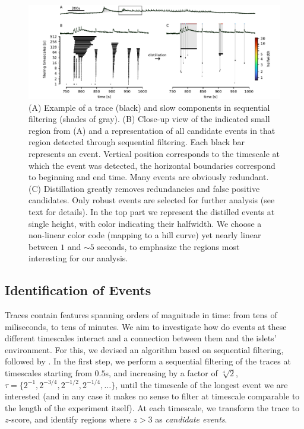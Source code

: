 \documentclass[a4paper,11pt,oneside,]{article}
\begin{document}
\begin{figure}[t]

 \centering
 \includegraphics[trim=12mm 0 0mm 0mm, scale=0.9]{figures/evdist.pdf}
 \caption{(A) Example of a trace (black) and slow components in sequential filtering (shades of gray). %
 (B) Close-up view of the indicated small region from (A) and a representation of all candidate events in that region detected through sequential filtering.
 Each black bar represents an event. Vertical position corresponds to the timescale at which the event was detected, the horizontal boundaries correspond to beginning and end time.
 Many events are obviously redundant. 
 (C) Distillation greatly removes redundancies and false positive candidates. Only robust events are selected for further analysis (see text for details). 
 In the top part we represent the distilled events at single height, with color indicating their halfwidth.
 We choose a non-linear color code (mapping to a hill curve) yet nearly linear between $1$ and $\sim 5$ seconds, to emphasize the regions most interesting for our analysis.
 }
 \label{fig:evdist_demo}
\end{figure}


\subsection{Identification of Events}

Traces contain features spanning orders of magnitude in time: from tens of miliseconds, to tens of minutes. 
We aim to investigate how do events at these different timescales interact and a connection between them and the islets' environment.
For this, we devised an algorithm based on sequential filtering, followed by .
In the first step, we perform a sequential filtering of the traces at timescales starting from $0.5$s, and increasing by a factor of $\sqrt[4]{2}$,  $\tau = \{2^{-1}, 2^{-3/4}, 2^{-1/2}, 2^{-1/4},\dots\}$, until the timescale of the longest event we are interested (and in any case it makes no sense to filter at timescale comparable to the length of the experiment itself).
At each timescale, we transform the trace to $z$-score, and identify regions where $z>3$ as {\it candidate events}. 
\end{document}
